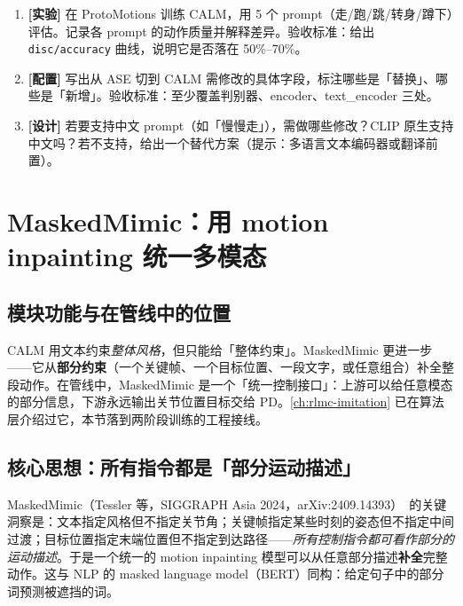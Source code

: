 \begin{practice}[练习·CALM]
\begin{enumerate}
  \item \textbf{[实验]} 在 ProtoMotions 训练 CALM，用 5 个 prompt（走/跑/跳/转身/蹲下）评估。记录各 prompt 的动作质量并解释差异。验收标准：给出 \verb|disc/accuracy| 曲线，说明它是否落在 50\%--70\%。
  \item \textbf{[配置]} 写出从 ASE 切到 CALM 需修改的具体字段，标注哪些是「替换」、哪些是「新增」。验收标准：至少覆盖判别器、encoder、text\_encoder 三处。
  \item \textbf{[设计]} 若要支持中文 prompt（如「慢慢走」），需做哪些修改？CLIP 原生支持中文吗？若不支持，给出一个替代方案（提示：多语言文本编码器或翻译前置）。
\end{enumerate}
\end{practice}

\section{MaskedMimic：用 motion inpainting 统一多模态}
\label{sec:rlmc-mm-masked}

\subsection{模块功能与在管线中的位置}
\label{sec:rlmc-mm-masked-pos}

CALM 用文本约束\emph{整体风格}，但只能给「整体约束」。MaskedMimic 更进一步——它从\textbf{部分约束}（一个关键帧、一个目标位置、一段文字，或任意组合）补全整段动作。在管线中，MaskedMimic 是一个「统一控制接口」：上游可以给任意模态的部分信息，下游永远输出关节位置目标交给 PD。\cref{ch:rlmc-imitation} 已在算法层介绍过它，本节落到两阶段训练的工程接线。

\subsection{核心思想：所有指令都是「部分运动描述」}
\label{sec:rlmc-mm-masked-idea}

MaskedMimic（Tessler 等，SIGGRAPH Asia 2024，arXiv:2409.14393）\,\cite{tessler2024maskedmimic} 的关键洞察是：文本指定风格但不指定关节角；关键帧指定某些时刻的姿态但不指定中间过渡；目标位置指定末端位置但不指定到达路径——\emph{所有控制指令都可看作部分的运动描述}。于是一个统一的 motion inpainting 模型可以从任意部分描述\textbf{补全}完整动作。这与 NLP 的 masked language model（BERT）同构：给定句子中的部分词预测被遮挡的词。

